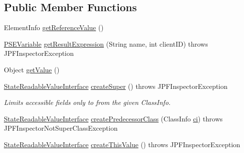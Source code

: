 \subsection*{Public Member Functions}
\begin{DoxyCompactItemize}
\item 
Element\+Info \hyperlink{classgov_1_1nasa_1_1jpf_1_1inspector_1_1server_1_1programstate_1_1_state_value_stack_slot_a3528938fc03c3b74d67e6fab291e872a}{get\+Reference\+Value} ()
\item 
\hyperlink{classgov_1_1nasa_1_1jpf_1_1inspector_1_1common_1_1pse_1_1_p_s_e_variable}{P\+S\+E\+Variable} \hyperlink{classgov_1_1nasa_1_1jpf_1_1inspector_1_1server_1_1programstate_1_1_state_value_stack_slot_a65a92b56e99ba60028d815086898bfe8}{get\+Result\+Expression} (String name, int client\+ID)  throws J\+P\+F\+Inspector\+Exception 
\item 
Object \hyperlink{classgov_1_1nasa_1_1jpf_1_1inspector_1_1server_1_1programstate_1_1_state_value_stack_slot_aa22a827a5e1960acc2528d2fce8a3e83}{get\+Value} ()
\item 
\hyperlink{interfacegov_1_1nasa_1_1jpf_1_1inspector_1_1server_1_1programstate_1_1_state_readable_value_interface}{State\+Readable\+Value\+Interface} \hyperlink{classgov_1_1nasa_1_1jpf_1_1inspector_1_1server_1_1programstate_1_1_state_value_stack_slot_adbb196cc5bbdf267dd4dfe65a04f198b}{create\+Super} ()  throws J\+P\+F\+Inspector\+Exception 
\begin{DoxyCompactList}\small\item\em Limits accessible fields only to from the given Class\+Info. \end{DoxyCompactList}\item 
\hyperlink{interfacegov_1_1nasa_1_1jpf_1_1inspector_1_1server_1_1programstate_1_1_state_readable_value_interface}{State\+Readable\+Value\+Interface} \hyperlink{classgov_1_1nasa_1_1jpf_1_1inspector_1_1server_1_1programstate_1_1_state_value_stack_slot_adf1124f4b69836bd31b52a986dbb481d}{create\+Predecessor\+Class} (Class\+Info \hyperlink{classgov_1_1nasa_1_1jpf_1_1inspector_1_1server_1_1programstate_1_1_state_value_a0eb4aa1e630ed6372dcfb8c41ae7edc5}{ci})  throws J\+P\+F\+Inspector\+Not\+Super\+Class\+Exception 
\item 
\hyperlink{interfacegov_1_1nasa_1_1jpf_1_1inspector_1_1server_1_1programstate_1_1_state_readable_value_interface}{State\+Readable\+Value\+Interface} \hyperlink{classgov_1_1nasa_1_1jpf_1_1inspector_1_1server_1_1programstate_1_1_state_value_stack_slot_a01d6d328957e42cae61c0ca47ee67d95}{create\+This\+Value} ()  throws J\+P\+F\+Inspector\+Exception 

\end{DoxyCompactItemize}

